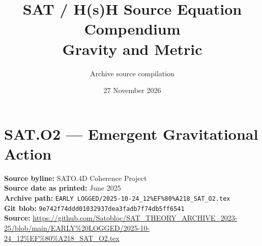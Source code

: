 \documentclass[11pt]{article}
\title{SAT / H(s)H Source Equation Compendium\\[3pt]\large Gravity and Metric}
\author{Archive source compilation}
\date{27 November 2026}
\begin{document}
\maketitle
\thispagestyle{empty}

\section*{SAT.O2 --- Emergent Gravitational Action}

\textbf{Source byline:} SATO.4D Coherence Project\\
\textbf{Source date as printed:} June 2025\\
\textbf{Archive path:} \texttt{EARLY LOGGED/2025-10-24\_12\%EF\%80\%A218\_SAT\_O2.tex}\\
\textbf{Git blob:} \texttt{9e742f74ddd01032937dea3fadb7f74db5ff6541}\\
\textbf{Source:} \url{https://github.com/Satobloc/SAT_THEORY_ARCHIVE_2023-25/blob/main/EARLY%20LOGGED/2025-10-24_12%EF%80%A218_SAT_O2.tex}
\end{document}

